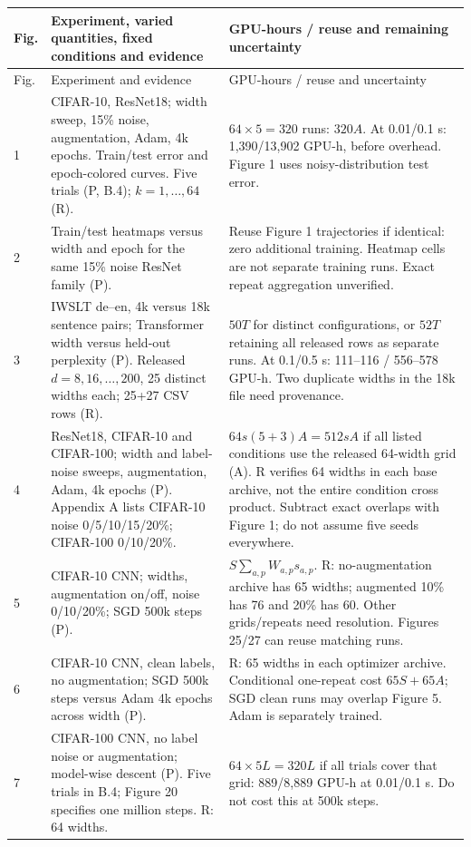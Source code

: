 \documentclass{article}
\begin{document}
\begin{longtable}{@{}P{0.32in}P{3.47in}P{2.9in}@{}}
\toprule
Fig. & Experiment, varied quantities, fixed conditions and evidence & GPU-hours / reuse and remaining uncertainty\\
\midrule\endfirsthead
\toprule Fig. & Experiment and evidence & GPU-hours / reuse and uncertainty\\\midrule{} & CIFAR-10, ResNet18; width sweep, 15\% noise, augmentation, Adam, 4k epochs. Train/test error and epoch-colored curves. Five trials (P, B.4); $k=1,\ldots,64$ (R). & $64\times5=320$ runs: $320A$. At 0.01/0.1 s: 1,390/13,902 GPU-h, before overhead. Figure 1 uses noisy-distribution test error.\\
2 & Train/test heatmaps versus width and epoch for the same 15\% noise ResNet family (P). & Reuse Figure 1 trajectories if identical: zero additional training. Heatmap cells are not separate training runs. Exact repeat aggregation unverified.\\
3 & IWSLT de--en, 4k versus 18k sentence pairs; Transformer width versus held-out perplexity (P). Released $d=8,16,\ldots,200$, 25 distinct widths each; 25+27 CSV rows (R). & $50T$ for distinct configurations, or $52T$ retaining all released rows as separate runs. At 0.1/0.5 s: 111--116 / 556--578 GPU-h. Two duplicate widths in the 18k file need provenance.\\
4 & ResNet18, CIFAR-10 and CIFAR-100; width and label-noise sweeps, augmentation, Adam, 4k epochs (P). Appendix A lists CIFAR-10 noise 0/5/10/15/20\%; CIFAR-100 0/10/20\%. & $64s(5+3)A=512sA$ if all listed conditions use the released 64-width grid (A). R verifies 64 widths in each base archive, not the entire condition cross product. Subtract exact overlaps with Figure 1; do not assume five seeds everywhere.\\
5 & CIFAR-10 CNN; widths, augmentation on/off, noise 0/10/20\%; SGD 500k steps (P). & $S\sum_{a,p}W_{a,p}s_{a,p}$. R: no-augmentation archive has 65 widths; augmented 10\% has 76 and 20\% has 60. Other grids/repeats need resolution. Figures 25/27 can reuse matching runs.\\
6 & CIFAR-10 CNN, clean labels, no augmentation; SGD 500k steps versus Adam 4k epochs across width (P). & R: 65 widths in each optimizer archive. Conditional one-repeat cost $65S+65A$; SGD clean runs may overlap Figure 5. Adam is separately trained.\\
7 & CIFAR-100 CNN, no label noise or augmentation; model-wise descent (P). Five trials in B.4; Figure 20 specifies one million steps. R: 64 widths. & $64\times5L=320L$ if all trials cover that grid: 889/8,889 GPU-h at 0.01/0.1 s. Do not cost this at 500k steps.\\

\end{longtable}
\end{document}
